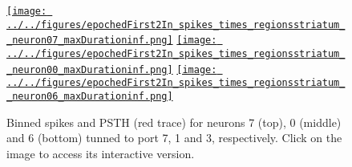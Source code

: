 \documentclass[12pt]{article}
\begin{document}
\listoffigures

\begin{figure}
    \begin{center}

        \href{http://www.gatsby.ucl.ac.uk/~rapela/sthita/reports/firstReport/figures/epochedFirst2In_spikes_times_regionsstriatum__neuron07_maxDurationinf.html}{\texttt{[image: ../../figures/epochedFirst2In\_spikes\_times\_regionsstriatum\_\_neuron07\_maxDurationinf.png]}}
        \href{http://www.gatsby.ucl.ac.uk/~rapela/sthita/reports/firstReport/figures/epochedFirst2In_spikes_times_regionsstriatum__neuron00_maxDurationinf.html}{\texttt{[image: ../../figures/epochedFirst2In\_spikes\_times\_regionsstriatum\_\_neuron00\_maxDurationinf.png]}}
        \href{http://www.gatsby.ucl.ac.uk/~rapela/sthita/reports/firstReport/figures/epochedFirst2In_spikes_times_regionsstriatum__neuron06_maxDurationinf.html}{\texttt{[image: ../../figures/epochedFirst2In\_spikes\_times\_regionsstriatum\_\_neuron06\_maxDurationinf.png]}}
        \linebreak

        \caption{Binned spikes and PSTH (red trace) for neurons 7 (top), 0
        (middle) and 6 (bottom) tunned to port 7, 1 and 3, respectively. Click
        on the image to access its interactive version.}
        \label{fig:binnedSpikesAndPSTHsForNeurons7_0_6}

    \end{center}
\end{figure}

\begin{comment}

\begin{figure}
    \begin{center}

        \href{http://www.gatsby.ucl.ac.uk/~rapela/sthita/reports/firstReport/figures/modelSelectionBlock00.html}{\texttt{[image: /nfs/ghome/live/rapela/svGPFA/repos/projects/svGPFA\_basal\_ganglia/code/slurm/figures/modelSelectionBlock00.png]}}

        \caption{Model selection. I selected a model with 10
        latent variables, since at this number the lower bound stopped
        increasing substantially. Click on the
        image to access its interactive version.}
        \label{fig:modelSelection}

    \end{center}
\end{figure}

\end{comment}
\end{document}
